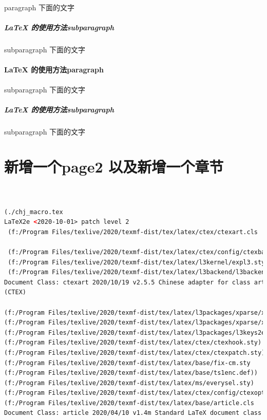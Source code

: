 \documentclass[UTF8]{ctexart}
\begin{document}
paragraph 下面的文字
\subparagraph{\LaTeX{} 的使用方法subparagraph}
subparagraph 下面的文字
\paragraph{\LaTeX{} 的使用方法paragraph}
subparagraph 下面的文字
\subparagraph{\LaTeX{} 的使用方法subparagraph}
subparagraph 下面的文字

\section{新增一个page2 以及新增一个章节}
\begin{lstlisting}[language=xml]


(./chj_macro.tex
LaTeX2e <2020-10-01> patch level 2
 (f:/Program Files/texlive/2020/texmf-dist/tex/latex/ctex/ctexart.cls

 (f:/Program Files/texlive/2020/texmf-dist/tex/latex/ctex/config/ctexbackend.cfg)
 (f:/Program Files/texlive/2020/texmf-dist/tex/latex/l3kernel/expl3.sty
 (f:/Program Files/texlive/2020/texmf-dist/tex/latex/l3backend/l3backend-xetex.def))
Document Class: ctexart 2020/10/19 v2.5.5 Chinese adapter for class article
(CTEX)

(f:/Program Files/texlive/2020/texmf-dist/tex/latex/l3packages/xparse/xparse.sty
(f:/Program Files/texlive/2020/texmf-dist/tex/latex/l3packages/xparse/xparse-generic.tex))
(f:/Program Files/texlive/2020/texmf-dist/tex/latex/l3packages/l3keys2e/l3keys2e.sty)
(f:/Program Files/texlive/2020/texmf-dist/tex/latex/ctex/ctexhook.sty)
(f:/Program Files/texlive/2020/texmf-dist/tex/latex/ctex/ctexpatch.sty)
(f:/Program Files/texlive/2020/texmf-dist/tex/latex/base/fix-cm.sty
(f:/Program Files/texlive/2020/texmf-dist/tex/latex/base/ts1enc.def))
(f:/Program Files/texlive/2020/texmf-dist/tex/latex/ms/everysel.sty)
(f:/Program Files/texlive/2020/texmf-dist/tex/latex/ctex/config/ctexopts.cfg)
(f:/Program Files/texlive/2020/texmf-dist/tex/latex/base/article.cls
Document Class: article 2020/04/10 v1.4m Standard LaTeX document class


\end{lstlisting}
\end{document}
